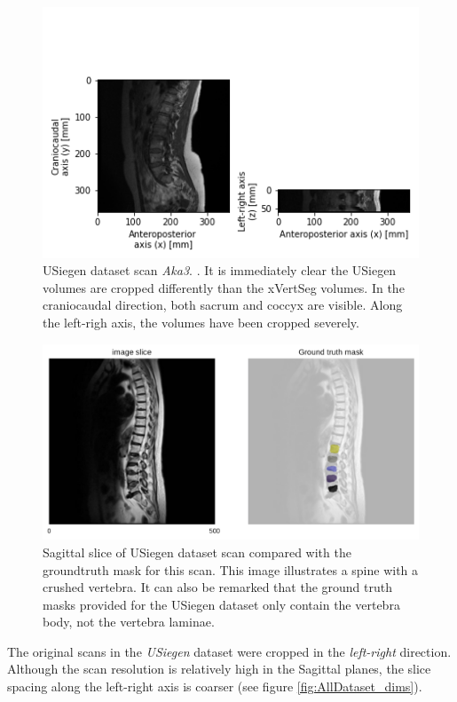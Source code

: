 \begin{figure}
    \centering
    \includegraphics[width=.95\textwidth]{automated_graphs/USiegen_Aka3.png}
    \caption{USiegen dataset scan \textit{Aka3}. \label{fig:USiegen_Aka3}. It is immediately clear the USiegen volumes are cropped differently than the xVertSeg volumes.
    In the craniocaudal direction, both sacrum and coccyx are visible. Along the left-righ axis, the volumes have been cropped severely.}
\end{figure}
\begin{figure}
    \centering
    \includegraphics[width=.95\textwidth]{images/USiegen004_s20_mask.pdf}
    \caption{\label{fig:USiegen004_s20_mask}Sagittal slice of USiegen dataset scan compared with the \Gls{groundtruth} mask for this scan.
    This image illustrates a spine with a crushed vertebra. 
    It can also be remarked that the ground truth masks provided for the USiegen dataset only contain the vertebra body, not the vertebra laminae.
    \protect
    }
\end{figure}

The original scans in the \textit{USiegen} dataset were cropped in the \textit{left-right} direction. 
Although the scan resolution is relatively high in the Sagittal planes, the slice spacing along the left-right axis is coarser (see figure \ref{fig:AllDataset_dims}).  